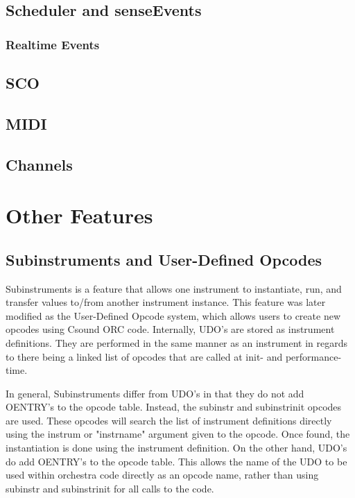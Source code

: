\documentclass[]{book}
\begin{document}
\section{Scheduler and senseEvents}

\subsection{Realtime Events}

\section{SCO}

\section{MIDI}

\section{Channels}


\chapter{Other Features}

\section{Subinstruments and User-Defined Opcodes}

Subinstruments is a feature that allows one instrument to instantiate, run, and transfer values to/from another instrument instance. This feature was later modified as the User-Defined Opcode system, which allows users to create new opcodes using Csound ORC code. Internally, UDO's are stored as instrument definitions. They are performed in the same manner as an instrument in regards to there being a linked list of opcodes that are called at init- and performance-time.  

In general, Subinstruments differ from UDO's in that they do not add OENTRY's to the opcode table.  Instead, the subinstr and subinstrinit opcodes are used.  These opcodes will search the list of instrument definitions directly using the instrum or "instrname" argument given to the opcode. Once found, the instantiation is done using the instrument definition.  On the other hand, UDO's do add OENTRY's to the opcode table. This allows the name of the UDO to be used within orchestra code directly as an opcode name, rather than using subinstr and subinstrinit for all calls to the code.
\end{document}
